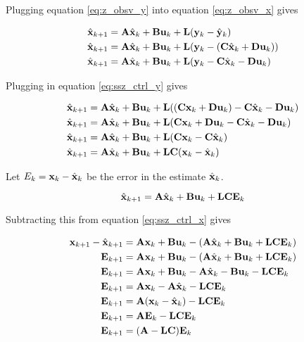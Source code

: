 Plugging equation \eqref{eq:z_obsv_y} into equation \eqref{eq:z_obsv_x} gives

\begin{align*}
  \hat{\mathbf{x}}_{k+1} &= \mathbf{A}\hat{\mathbf{x}}_k + \mathbf{B}\mathbf{u}_k +
    \mathbf{L} (\mathbf{y}_k - \hat{\mathbf{y}}_k) \\
  \hat{\mathbf{x}}_{k+1} &= \mathbf{A}\hat{\mathbf{x}}_k + \mathbf{B}\mathbf{u}_k +
    \mathbf{L} (\mathbf{y}_k - (\mathbf{C}\hat{\mathbf{x}}_k + \mathbf{D}\mathbf{u}_k)) \\
  \hat{\mathbf{x}}_{k+1} &= \mathbf{A}\hat{\mathbf{x}}_k + \mathbf{B}\mathbf{u}_k +
    \mathbf{L} (\mathbf{y}_k - \mathbf{C}\hat{\mathbf{x}}_k - \mathbf{D}\mathbf{u}_k)
\end{align*}

Plugging in equation \eqref{eq:ssz_ctrl_y} gives

\begin{align*}
  \hat{\mathbf{x}}_{k+1} &= \mathbf{A}\hat{\mathbf{x}}_k + \mathbf{B}\mathbf{u}_k +
    \mathbf{L}((\mathbf{C}\mathbf{x}_k + \mathbf{D}\mathbf{u}_k) - \mathbf{C}\hat{\mathbf{x}}_k -
    \mathbf{D}\mathbf{u}_k) \\
  \hat{\mathbf{x}}_{k+1} &= \mathbf{A}\hat{\mathbf{x}}_k + \mathbf{B}\mathbf{u}_k +
    \mathbf{L}(\mathbf{C}\mathbf{x}_k + \mathbf{D}\mathbf{u}_k - \mathbf{C}\hat{\mathbf{x}}_k -
    \mathbf{D}\mathbf{u}_k) \\
  \hat{\mathbf{x}}_{k+1} &= \mathbf{A}\hat{\mathbf{x}}_k + \mathbf{B}\mathbf{u}_k +
    \mathbf{L}(\mathbf{C}\mathbf{x}_k - \mathbf{C}\hat{\mathbf{x}}_k) \\
  \hat{\mathbf{x}}_{k+1} &= \mathbf{A}\hat{\mathbf{x}}_k + \mathbf{B}\mathbf{u}_k +
    \mathbf{L}\mathbf{C}(\mathbf{x}_k - \hat{\mathbf{x}}_k)
\end{align*}

Let $E_k = \mathbf{x}_k - \hat{\mathbf{x}}_k$ be the \gls{error} in the estimate
$\hat{\mathbf{x}}_k$.

\begin{equation*}
  \hat{\mathbf{x}}_{k+1} = \mathbf{A}\hat{\mathbf{x}}_k + \mathbf{B}\mathbf{u}_k +
    \mathbf{L}\mathbf{C}\mathbf{E}_k
\end{equation*}

Subtracting this from equation \eqref{eq:ssz_ctrl_x} gives

\begin{align}
  \mathbf{x}_{k+1} - \hat{\mathbf{x}}_{k+1} &= \mathbf{A}\mathbf{x}_k + \mathbf{B}\mathbf{u}_k -
    (\mathbf{A}\hat{\mathbf{x}}_k + \mathbf{B}\mathbf{u}_k +
     \mathbf{L}\mathbf{C}\mathbf{E}_k) \nonumber \\
  \mathbf{E}_{k+1} &= \mathbf{A}\mathbf{x}_k + \mathbf{B}\mathbf{u}_k -
    (\mathbf{A}\hat{\mathbf{x}}_k + \mathbf{B}\mathbf{u}_k + \mathbf{L}\mathbf{C}\mathbf{E}_k)
    \nonumber \\
  \mathbf{E}_{k+1} &= \mathbf{A}\mathbf{x}_k + \mathbf{B}\mathbf{u}_k -
    \mathbf{A}\hat{\mathbf{x}}_k - \mathbf{B}\mathbf{u}_k - \mathbf{L}\mathbf{C}\mathbf{E}_k
    \nonumber \\
  \mathbf{E}_{k+1} &= \mathbf{A}\mathbf{x}_k - \mathbf{A}\hat{\mathbf{x}}_k -
    \mathbf{L}\mathbf{C}\mathbf{E}_k \nonumber \\
  \mathbf{E}_{k+1} &= \mathbf{A}(\mathbf{x}_k - \hat{\mathbf{x}}_k) -
    \mathbf{L}\mathbf{C}\mathbf{E}_k \nonumber \\
  \mathbf{E}_{k+1} &= \mathbf{A}\mathbf{E}_k - \mathbf{L}\mathbf{C}\mathbf{E}_k \nonumber \\
  \mathbf{E}_{k+1} &= (\mathbf{A} - \mathbf{L}\mathbf{C})\mathbf{E}_k \label{eq:obsv_eig_calc}
\end{align}

